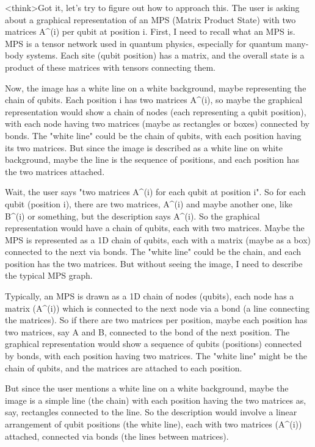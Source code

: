 <think>Got it, let's try to figure out how to approach this. The user is asking about a graphical representation of an MPS (Matrix Product State) with two matrices A^(i) per qubit at position i. First, I need to recall what an MPS is. MPS is a tensor network used in quantum physics, especially for quantum many-body systems. Each site (qubit position) has a matrix, and the overall state is a product of these matrices with tensors connecting them.

Now, the image has a white line on a white background, maybe representing the chain of qubits. Each position i has two matrices A^(i), so maybe the graphical representation would show a chain of nodes (each representing a qubit position), with each node having two matrices (maybe as rectangles or boxes) connected by bonds. The "white line" could be the chain of qubits, with each position having its two matrices. But since the image is described as a white line on white background, maybe the line is the sequence of positions, and each position has the two matrices attached. 

Wait, the user says "two matrices A^(i) for each qubit at position i". So for each qubit (position i), there are two matrices, A^(i) and maybe another one, like B^(i) or something, but the description says A^(i). So the graphical representation would have a chain of qubits, each with two matrices. Maybe the MPS is represented as a 1D chain of qubits, each with a matrix (maybe as a box) connected to the next via bonds. The "white line" could be the chain, and each position has the two matrices. But without seeing the image, I need to describe the typical MPS graph. 

Typically, an MPS is drawn as a 1D chain of nodes (qubits), each node has a matrix (A^(i)) which is connected to the next node via a bond (a line connecting the matrices). So if there are two matrices per position, maybe each position has two matrices, say A and B, connected to the bond of the next position. The graphical representation would show a sequence of qubits (positions) connected by bonds, with each position having two matrices. The "white line" might be the chain of qubits, and the matrices are attached to each position. 

But since the user mentions a white line on a white background, maybe the image is a simple line (the chain) with each position having the two matrices as, say, rectangles connected to the line. So the description would involve a linear arrangement of qubit positions (the white line), each with two matrices (A^(i)) attached, connected via bonds (the lines between matrices). 

